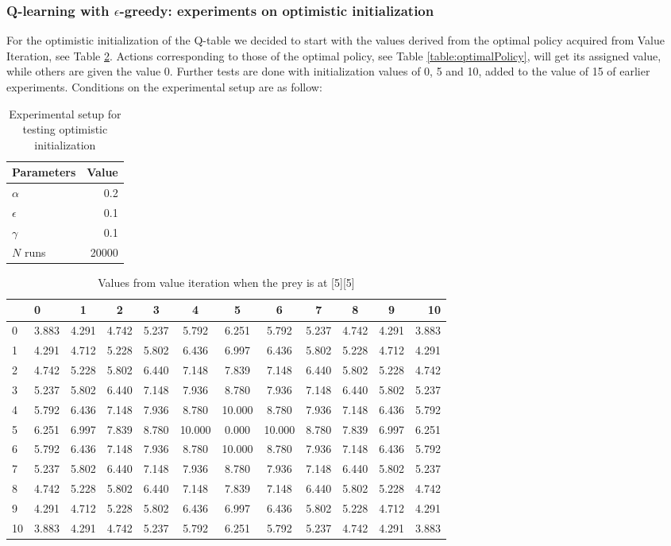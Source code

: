 \documentclass[paper=a4, fontsize=11pt]{scrartcl}
\numberwithin{equation}{section}		%
\numberwithin{figure}{section}			%
\numberwithin{table}{section}				%
\begin{document}
\subsubsection*{Q-learning with $\epsilon$-greedy: experiments on optimistic initialization}
For the optimistic initialization of the Q-table we decided to start with the values derived from the optimal policy acquired from Value Iteration, see Table \ref{table:vi}. Actions corresponding to those of the optimal policy, see Table \ref{table:optimalPolicy}, will get its assigned value, while others are given the value 0. Further tests are done with initialization values of 0, 5 and 10, added to the value of 15 of earlier experiments. Conditions on the experimental setup are as follow:
\begin{table}[H]
\caption{Experimental setup for testing optimistic initialization}
\centering
\begin{tabular}{|l|r|}
\hline
Parameters & Value \\\hline
$\alpha$ & 0.2 \\\hline
$\epsilon$ & 0.1 \\\hline
$\gamma$ & 0.1\\\hline
$N$ runs & 20000\\\hline
\end{tabular}
\label{expSetupOptimInit}
\end{table}
\begin{table}[H]
\caption{Values from value iteration when the prey is at [5][5]}
\centering
\begin{tabular}{l|l*{9}{c}r}
  \hline
 & 0 & 1 & 2 & 3 & 4 & 5 & 6 & 7 & 8 & 9 & 10 \\ \hline 
0 & 3.883 & 4.291 & 4.742 & 5.237 & 5.792 & 6.251 & 5.792 & 5.237 & 4.742 & 4.291 & 3.883 \\
1 & 4.291 & 4.712 & 5.228 & 5.802 & 6.436 & 6.997 & 6.436 & 5.802 & 5.228 & 4.712 & 4.291 \\
2 & 4.742 & 5.228 & 5.802 & 6.440 & 7.148 & 7.839 & 7.148 & 6.440 & 5.802 & 5.228 & 4.742 \\
3 & 5.237 & 5.802 & 6.440 & 7.148 & 7.936 & 8.780 & 7.936 & 7.148 & 6.440 & 5.802 & 5.237 \\
4 & 5.792 & 6.436 & 7.148 & 7.936 & 8.780 & 10.000 & 8.780 & 7.936 & 7.148 & 6.436 & 5.792 \\
5 & 6.251 & 6.997 & 7.839 & 8.780 & 10.000 & 0.000 & 10.000 & 8.780 & 7.839 & 6.997 & 6.251 \\
6 & 5.792 & 6.436 & 7.148 & 7.936 & 8.780 & 10.000 & 8.780 & 7.936 & 7.148 & 6.436 & 5.792 \\
7 & 5.237 & 5.802 & 6.440 & 7.148 & 7.936 & 8.780 & 7.936 & 7.148 & 6.440 & 5.802 & 5.237 \\
8 & 4.742 & 5.228 & 5.802 & 6.440 & 7.148 & 7.839 & 7.148 & 6.440 & 5.802 & 5.228 & 4.742 \\
9& 4.291 & 4.712 & 5.228 & 5.802 & 6.436 & 6.997 & 6.436 & 5.802 & 5.228 & 4.712 & 4.291 \\
10& 3.883 & 4.291 & 4.742 & 5.237 & 5.792 & 6.251 & 5.792 & 5.237 & 4.742 & 4.291 & 3.883
\end{tabular}
\label{table:vi}
\end{table}
\end{document}
